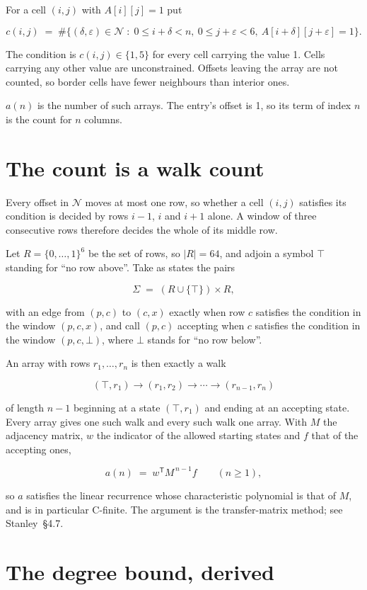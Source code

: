 \documentclass[11pt]{article}
\theoremstyle{definition}
\begin{document}
For a cell $(i,j)$ with $A[i][j] = 1$ put

\[c(i,j) \;=\; \#\bigl\{(\delta,\varepsilon)\in\mathcal{N} \;:\; 0\le i+\delta<n,\ 0\le j+\varepsilon<6,\ A[i+\delta][j+\varepsilon] = 1\bigr\}.\]

The condition is $c(i,j) \in \{1, 5\}$ for every cell carrying the value 1. Cells carrying any other value are unconstrained. Offsets leaving the array are not counted, so border cells have fewer neighbours than interior ones.

$a(n)$ is the number of such arrays. The entry's offset is 1, so its term of index $n$ is the count for $n$ columns.

\section{The count is a walk count}

Every offset in $\mathcal{N}$ moves at most one row, so whether a cell $(i,j)$ satisfies its condition is decided by rows $i-1$, $i$ and $i+1$ alone. A window of three consecutive rows therefore decides the whole of its middle row.

Let $R = \{0,\dots,1\}^{6}$ be the set of rows, so $|R| = 64$, and adjoin a symbol $\top$ standing for ``no row above''. Take as states the pairs

\[\Sigma \;=\; (R \cup \{\top\}) \times R,\]

with an edge from $(p,c)$ to $(c,x)$ exactly when row $c$ satisfies the condition in the window $(p,c,x)$, and call $(p,c)$ accepting when $c$ satisfies the condition in the window $(p,c,\bot)$, where $\bot$ stands for ``no row below''.

An array with rows $r_1,\dots,r_n$ is then exactly a walk

\[(\top,r_1) \to (r_1,r_2) \to \cdots \to (r_{n-1},r_n)\]

of length $n-1$ beginning at a state $(\top,r_1)$ and ending at an accepting state. Every array gives one such walk and every such walk one array. With $M$ the adjacency matrix, $w$ the indicator of the allowed starting states and $f$ that of the accepting ones,

\[a(n) \;=\; w^{\mathsf T} M^{\,n-1} f \qquad (n \ge 1),\]

so $a$ satisfies the linear recurrence whose characteristic polynomial is that of $M$, and is in particular C-finite. The argument is the transfer-matrix method; see Stanley~\S4.7.

\section{The degree bound, derived}
\end{document}
